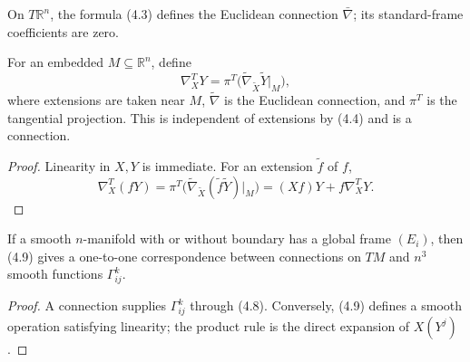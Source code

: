 \begin{example}
\label{ex:euclidean-connection}
On $T\mathbb R^n$, the formula (4.3) defines the Euclidean connection $\bar\nabla$; its standard-frame coefficients are zero.
\end{example}

\begin{example}
\label{ex:tangential-connection-submanifold}

For an embedded $M\subseteq\mathbb R^n$, define
\[
\nabla_X^TY=\pi^T\bigl(\widetilde\nabla_{\widetilde X}\widetilde Y|_M\bigr),
\]
where extensions are taken near $M$, $\widetilde\nabla$ is the Euclidean connection, and $\pi^T$ is the tangential projection. This is independent of extensions by (4.4) and is a connection.
\end{example}
\begin{proof}
\sketch Linearity in $X,Y$ is immediate. For an extension $\widetilde f$ of $f$,
\[
\nabla_X^T(fY)=\pi^T\bigl(\widetilde\nabla_{\widetilde X}(\widetilde f\widetilde Y)|_M\bigr)=(Xf)Y+f\nabla_X^TY.
\]
\end{proof}

\begin{lemma}
\label{lem:connections-from-connection-coefficients}




If a smooth $n$-manifold with or without boundary has a global frame $(E_i)$, then (4.9) gives a one-to-one correspondence between connections on $TM$ and $n^3$ smooth functions $\Gamma^k_{ij}$.
\end{lemma}
\begin{proof}
\sketch A connection supplies $\Gamma^k_{ij}$ through (4.8). Conversely, (4.9) defines a smooth operation satisfying linearity; the product rule is the direct expansion of $X(Y^j)$.
\end{proof}

